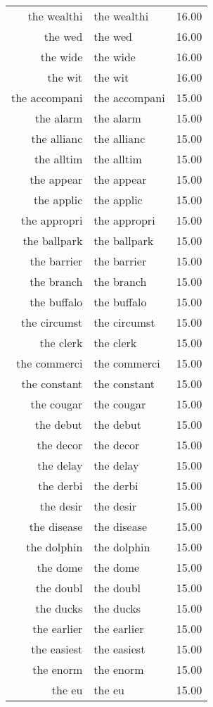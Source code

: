 \begin{table}[ht]
\begin{tabular}{rlr}
  the wealthi & the wealthi & 16.00 \\ 
  the wed & the wed & 16.00 \\ 
  the wide & the wide & 16.00 \\ 
  the wit & the wit & 16.00 \\ 
  the accompani & the accompani & 15.00 \\ 
  the alarm & the alarm & 15.00 \\ 
  the allianc & the allianc & 15.00 \\ 
  the alltim & the alltim & 15.00 \\ 
  the appear & the appear & 15.00 \\ 
  the applic & the applic & 15.00 \\ 
  the appropri & the appropri & 15.00 \\ 
  the ballpark & the ballpark & 15.00 \\ 
  the barrier & the barrier & 15.00 \\ 
  the branch & the branch & 15.00 \\ 
  the buffalo & the buffalo & 15.00 \\ 
  the circumst & the circumst & 15.00 \\ 
  the clerk & the clerk & 15.00 \\ 
  the commerci & the commerci & 15.00 \\ 
  the constant & the constant & 15.00 \\ 
  the cougar & the cougar & 15.00 \\ 
  the debut & the debut & 15.00 \\ 
  the decor & the decor & 15.00 \\ 
  the delay & the delay & 15.00 \\ 
  the derbi & the derbi & 15.00 \\ 
  the desir & the desir & 15.00 \\ 
  the disease & the disease & 15.00 \\ 
  the dolphin & the dolphin & 15.00 \\ 
  the dome & the dome & 15.00 \\ 
  the doubl & the doubl & 15.00 \\ 
  the ducks & the ducks & 15.00 \\ 
  the earlier & the earlier & 15.00 \\ 
  the easiest & the easiest & 15.00 \\ 
  the enorm & the enorm & 15.00 \\ 
  the eu & the eu & 15.00 \\ 

\end{tabular}
\end{table}

